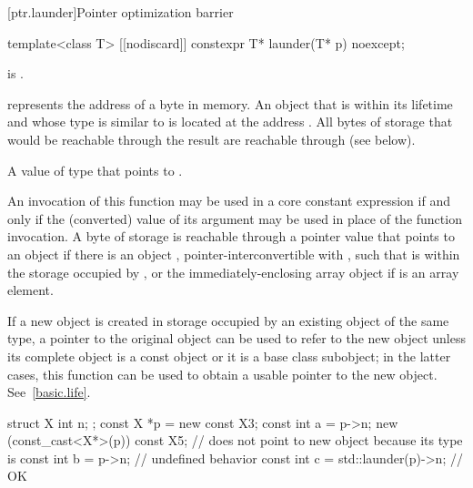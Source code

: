 [ptr.launder]{Pointer optimization barrier}

%
\begin{itemdecl}
template<class T> [[nodiscard]] constexpr T* launder(T* p) noexcept;
\end{itemdecl}

\begin{itemdescr}
\pnum
\mandates
{} is .

\pnum
\expects
{} represents the address  of a byte in memory.
An object  that is within its lifetime
and whose type is similar to 
is located at the address .
All bytes of storage that would be reachable through the result
are reachable through  (see below).

\pnum
\returns
A value of type  that points to .

\pnum
\remarks
An invocation of this function
may be used in a core constant expression
if and only if the (converted) value of its argument
may be used in place of the function invocation.
A byte of storage  is
reachable through a pointer value
that points to an object 
if there is an object ,
pointer-interconvertible with ,
such that  is within the storage occupied by
, or
the immediately-enclosing array object if  is an array element.

\pnum
\begin{note}
If a new object is created
in storage occupied by an existing object of the same type,
a pointer to the original object
can be used to refer to the new object
unless its complete object is a const object or it is a base class subobject;
in the latter cases,
this function can be used to obtain a usable pointer to the new object.
See~\ref{basic.life}.
\end{note}

\pnum
\begin{example}
\begin{codeblock}
struct X { int n; };
const X *p = new const X{3};
const int a = p->n;
new (const_cast<X*>(p)) const X{5}; //  does not point to new object because its type is 
const int b = p->n;                 // undefined behavior
const int c = std::launder(p)->n;   // OK
\end{codeblock}
\end{example}
\end{itemdescr}

